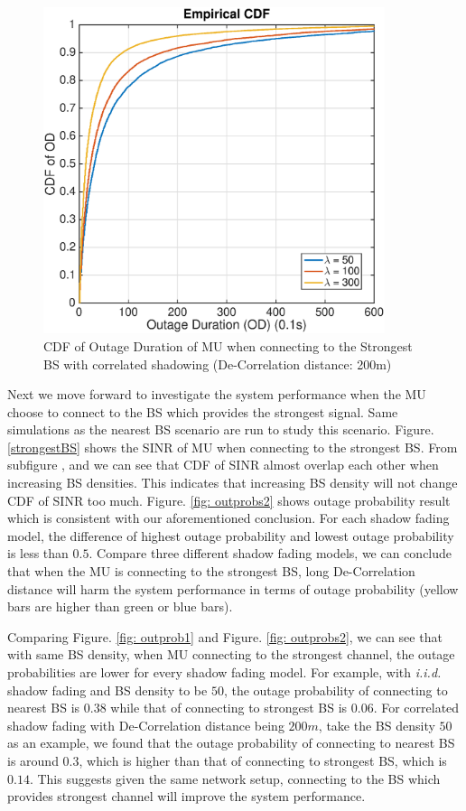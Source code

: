 \begin{figure}
\centering
\includegraphics[width=10cm]{ODthresh-5DeCorr200Max.eps}
\caption{CDF of Outage Duration of MU when connecting to the Strongest BS with correlated shadowing (De-Correlation distance: 200m)}
\label{corr2}
\end{figure}
\par Next we move forward to investigate the system performance when the MU choose to connect to the BS which provides the strongest signal. Same simulations as the nearest BS scenario are run to study this scenario. Figure. \ref{strongestBS} shows the SINR of MU when connecting to the strongest BS. From subfigure ,  and  we can see that CDF of SINR almost overlap each other when increasing BS densities. This indicates that increasing BS density will not change CDF of SINR too much. Figure. \ref{fig: outprobs2} shows outage probability result which is consistent with our aforementioned conclusion. For each shadow fading model, the difference of highest outage probability and lowest outage probability is less than $0.5$. Compare three different shadow fading models, we can conclude that when the MU is connecting to the strongest BS, long De-Correlation distance will harm the system performance in terms of outage probability (yellow bars are higher than green or blue bars). 
\par Comparing Figure. \ref{fig: outprob1} and Figure. \ref{fig: outprobs2}, we can see that with same BS density, when MU connecting to the strongest channel, the outage probabilities are lower for every shadow fading model. For example, with \emph{i.i.d.} shadow fading and BS density to be $50$, the outage probability of connecting to nearest BS is $0.38$ while that of connecting to strongest BS is $0.06$. For correlated shadow fading with De-Correlation distance being $200m$, take the BS density $50$ as an example, we found that the outage probability of connecting to nearest BS is around $0.3$, which is higher than that of connecting to strongest BS, which is $0.14$. This suggests given the same network setup, connecting to the BS which provides strongest channel will improve the system performance. 









